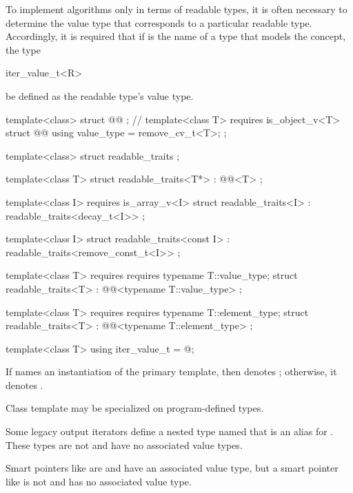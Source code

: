 \begin{addedblock}
\pnum
To implement algorithms only in terms of readable types, it is often necessary
to determine the value type that corresponds to a particular readable type.
Accordingly, it is required that if  is the name of a type that
models the  concept,
the type

\begin{codeblock}
iter_value_t<R>
\end{codeblock}

be defined as the readable type's value type.

%
%
\begin{codeblock}
  template<class> struct @@ { }; // \expos
  template<class T>
    requires is_object_v<T>
  struct @@ {
    using value_type = remove_cv_t<T>;
  };

  template<class> struct readable_traits { };

  template<class T>
  struct readable_traits<T*>
    : @@<T> { };

  template<class I>
    requires is_array_v<I>
  struct readable_traits<I>
    : readable_traits<decay_t<I>> { };

  template<class I>
  struct readable_traits<const I>
    : readable_traits<remove_const_t<I>> { };

  template<class T>
    requires requires { typename T::value_type; }
  struct readable_traits<T>
    : @@<typename T::value_type> { };

  template<class T>
    requires requires { typename T::element_type; }
  struct readable_traits<T>
    : @@<typename T::element_type> { };

  template<class T> using iter_value_t = @\seebelownc@;
\end{codeblock}

\pnum
If  names an instantiation of the primary template,
then  denotes ;
otherwise, it denotes .

\pnum
Class template  may be specialized
on program-defined types.

\pnum
\begin{note}
Some legacy output iterators define a nested type named 
that is an alias for . These types are not 
and have no associated value types.
\end{note}

\pnum
\begin{note}
Smart pointers like  are  and
have an associated value type, but a smart pointer like 
is not  and has no associated value type.
\end{note}
\end{addedblock}

